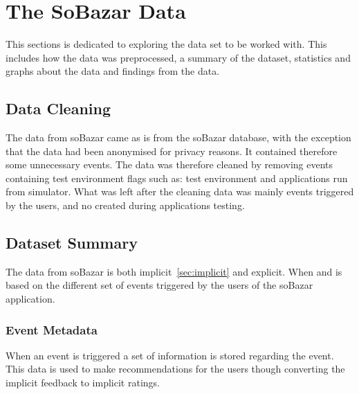 
\chapter{The SoBazar Data}
\minitoc
    This sections is dedicated to exploring the data set to be worked with.
    This includes how the data was preprocessed, a summary of the dataset, statistics and graphs about the data and findings from the data.


\section{Data Cleaning}
    The data from soBazar came as is from the soBazar database, with the exception that the data had been anonymised for privacy reasons.
    It contained therefore some unnecessary events.
    The data was therefore cleaned by removing events containing test environment flags such as: test environment and applications run from simulator.
    What was left after the cleaning data was mainly events triggered by the users, and no created during applications testing.

\section{Dataset Summary}
    The data from soBazar is both implicit~\ref{sec:implicit} and explicit.
    When and is based on the different set of events triggered by the users of the soBazar application.

\subsection{Event Metadata}
    When an event is triggered a set of information is stored regarding the event.
    This data is used to make recommendations for the users though converting the implicit feedback to implicit ratings.

